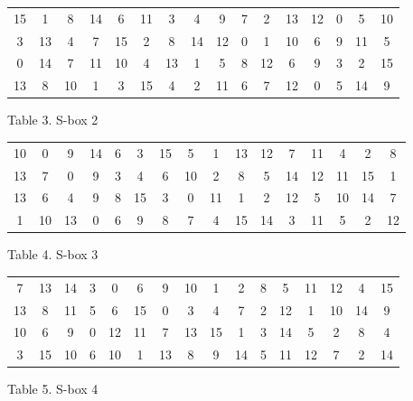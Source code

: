 \documentclass[11pt]{article}
\begin{document}
\begin{center}
\begin{tabular}{ | c | c | c | c | c | c | c | c | c | c | c | c | c | c | c | c |}
  \hline
    15&	1& 8& 14& 6& 11& 3& 4& 9& 7& 2& 13& 12& 0&	5& 10\\
    3& 13& 4& 7& 15& 2& 8& 14& 12& 0& 1& 10& 6& 9&	11& 5\\
    0& 14& 7& 11& 10& 4& 13& 1& 5& 8& 12& 6& 9& 3&	2& 15\\
    13&	8& 10& 1& 3& 15& 4& 2& 11& 6& 7& 12& 0& 5&	14& 9\\
  \hline
\end{tabular}
\end{center}
\begin{center}
Table 3. S-box 2
\end{center}

\begin{center}
\begin{tabular}{ | c | c | c | c | c | c | c | c | c | c | c | c | c | c | c | c |}
  \hline
    10&	0& 9& 14& 6& 3& 15& 5& 1& 13& 12& 7& 11& 4&	2& 8\\
    13&	7& 0& 9& 3& 4& 6& 10& 2& 8& 5& 14& 12& 11& 15& 1\\
    13&	6& 4& 9& 8& 15& 3& 0& 11& 1& 2& 12& 5&	10& 14& 7\\
    1& 10& 13& 0& 6& 9& 8& 7& 4& 15& 14& 3& 11& 5& 2& 12\\
  \hline
\end{tabular}
\end{center}
\begin{center}
Table 4. S-box 3
\end{center}

\begin{center}
\begin{tabular}{ | c | c | c | c | c | c | c | c | c | c | c | c | c | c | c | c |}
  \hline
    7&	13& 14& 3& 0& 6& 9& 10&	1& 2& 8& 5& 11& 12&	4& 15\\
    13&	8& 11& 5& 6& 15& 0& 3& 4& 7& 2& 12& 1& 10& 14& 9\\
    10&	6& 9& 0& 12& 11& 7&	13& 15& 1& 3& 14& 5& 2& 8& 4\\
    3&	15& 10& 6& 10& 1& 13& 8& 9& 14& 5& 11& 12& 7& 2& 14\\
  \hline
\end{tabular}
\end{center}
\begin{center}
Table 5. S-box 4
\end{center}
\end{document}
